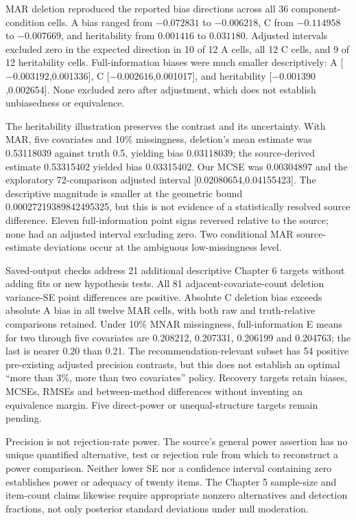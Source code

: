\documentclass[11pt]{article}
\begin{document}
MAR deletion reproduced the reported bias directions across all 36 component-condition cells. A bias ranged from $-0.072831$ to $-0.006218$, C from $-0.114958$ to $-0.007669$, and heritability from $0.001416$ to $0.031180$. Adjusted intervals excluded zero in the expected direction in 10 of 12 A cells, all 12 C cells, and 9 of 12 heritability cells. Full-information biases were much smaller descriptively: A [$-0.003192$,0.001336], C [$-0.002616$,0.001017], and heritability [$-0.001390$,0.002654]. None excluded zero after adjustment, which does not establish unbiasedness or equivalence.

The heritability illustration preserves the contrast and its uncertainty. With MAR, five covariates and 10\% missingness, deletion's mean estimate was 0.53118039 against truth 0.5, yielding bias 0.03118039; the source-derived estimate 0.53315402 yielded bias 0.03315402. Our MCSE was 0.00304897 and the exploratory 72-comparison adjusted interval [0.02080654,0.04155423]. The descriptive magnitude is smaller at the geometric bound 0.00027219389842495325, but this is not evidence of a statistically resolved source difference. Eleven full-information point signs reversed relative to the source; none had an adjusted interval excluding zero. Two conditional MAR source-estimate deviations occur at the ambiguous low-missingness level.

Saved-output checks address 21 additional descriptive Chapter 6 targets without adding fits or new hypothesis tests. All 81 adjacent-covariate-count deletion variance-SE point differences are positive. Absolute C deletion bias exceeds absolute A bias in all twelve MAR cells, with both raw and truth-relative comparisons retained. Under 10\% MNAR missingness, full-information E means for two through five covariates are 0.208212, 0.207331, 0.206199 and 0.204763; the last is nearer 0.20 than 0.21. The recommendation-relevant subset has 54 positive pre-existing adjusted precision contrasts, but this does not establish an optimal ``more than 3\%, more than two covariates'' policy. Recovery targets retain biases, MCSEs, RMSEs and between-method differences without inventing an equivalence margin. Five direct-power or unequal-structure targets remain pending.

Precision is not rejection-rate power. The source's general power assertion has no unique quantified alternative, test or rejection rule from which to reconstruct a power comparison. Neither lower SE nor a confidence interval containing zero establishes power or adequacy of twenty items. The Chapter 5 sample-size and item-count claims likewise require appropriate nonzero alternatives and detection fractions, not only posterior standard deviations under null moderation.
\end{document}
